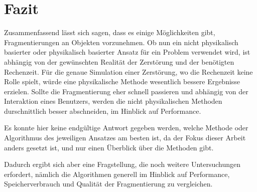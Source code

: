 \chapter{Fazit}

Zusammenfassend lässt sich sagen, dass es einige Möglichkeiten gibt, Fragmentierungen an Objekten vorzunehmen. Ob nun ein nicht physikalisch basierter oder
physikalisch basierter Ansatz für ein Problem verwendet wird, ist abhängig von der gewünschten Realität der Zerstörung und der benötigten Rechenzeit.
Für die genaue Simulation einer Zerstörung, wo die Rechenzeit keine Rolle spielt, würde eine physikalische Methode wesentlich bessere Ergebnisse erzielen.
Sollte die Fragmentierung eher schnell passieren und abhängig von der Interaktion eines Benutzers, werden die nicht physikalischen Methoden durschnittlich
besser abschneiden, im Hinblick auf Performance.  

Es konnte hier keine endgültige Antwort gegeben werden, welche Methode oder Algorithmus des jeweiligen Ansatzes am besten ist, da der Fokus dieser Arbeit
anders gesetzt ist, und nur einen Überblick über die Methoden gibt.

Dadurch ergibt sich aber eine Fragstellung, die noch weitere Untersuchungen erfordert, nämlich die Algorithmen generell im Hinblick auf Performance, Speicherverbrauch 
und Qualität der Fragmentierung zu vergleichen.



